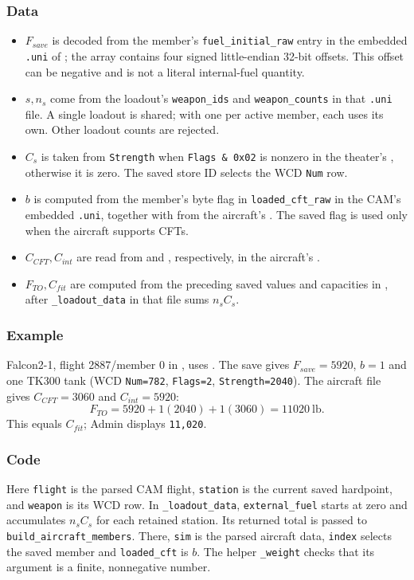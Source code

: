 \documentclass[10pt,a4paper]{amsart}
\begin{document}
\subsubsection*{Data}
\begin{itemize}
\setlength{\itemsep}{0pt}
\setlength{\parsep}{0pt}
\item $F_{save}$ is decoded from the member's \texttt{fuel\_initial\_raw}
entry in the embedded \texttt{.uni} of ; the array contains
four signed little-endian 32-bit offsets. This offset can be negative and
is not a literal internal-fuel quantity.
\item $s,n_s$ come from the loadout's \texttt{weapon\_ids} and
\texttt{weapon\_counts} in that \texttt{.uni} file. A single loadout is
shared; with one per active member, each uses its own. Other loadout
counts are rejected.
\item $C_s$ is taken from \texttt{Strength} when \texttt{Flags \& 0x02}
is nonzero in the theater's ,
otherwise it is zero. The saved store ID selects the WCD \texttt{Num} row.
\item $b$ is computed from the member's byte flag in
\texttt{loaded\_cft\_raw} in the CAM's embedded \texttt{.uni}, together
with  from the aircraft's .
The saved flag is used only when the aircraft supports CFTs.
\item $C_{CFT},C_{int}$ are read from  and
, respectively, in the aircraft's
.
\item $F_{TO},C_{fit}$ are computed from the preceding saved values and
capacities in ,
after \texttt{\_loadout\_data} in that file sums $n_sC_s$.
\end{itemize}

\subsubsection*{Example}
Falcon2-1, flight 2887/member 0 in ,
uses .
The save gives $F_{save}=5920$, $b=1$ and one TK300 tank
(WCD \texttt{Num=782}, \texttt{Flags=2}, \texttt{Strength=2040}).
The aircraft file gives $C_{CFT}=3060$ and $C_{int}=5920$:
\[
 F_{TO}=5920+1(2040)+1(3060)=11020\ \text{lb}.
\]
This equals $C_{fit}$; Admin displays \texttt{11,020}.

\subsubsection*{Code}
Here \texttt{flight} is the parsed CAM flight, \texttt{station} is the
current saved hardpoint, and \texttt{weapon} is its WCD row.
In \texttt{\_loadout\_data}, \texttt{external\_fuel} starts at zero and
accumulates $n_sC_s$ for each retained station. Its returned total is passed
to \texttt{build\_aircraft\_members}. There, \texttt{sim} is the parsed
aircraft data, \texttt{index} selects the saved member and
\texttt{loaded\_cft} is $b$. The helper \texttt{\_weight} checks that its
argument is a finite, nonnegative number.
\end{document}
